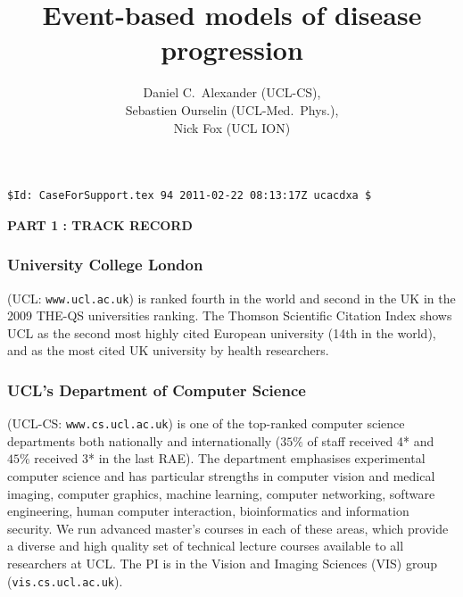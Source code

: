 \documentclass[a4paper,11pt]{article}
\begin{document}


\title{Event-based models of disease progression}

\author{Daniel C.\ Alexander (UCL-CS),\\Sebastien Ourselin (UCL-Med.\ Phys.),\\Nick Fox (UCL ION)}

\date{}

\maketitle

\begin{verbatim}
$Id: CaseForSupport.tex 94 2011-02-22 08:13:17Z ucacdxa $
\end{verbatim}

\clearpage


\setcounter{page}{1}

\textbf{PART 1 : TRACK RECORD}\\

\subsubsection*{University College London}
(UCL: \verb+www.ucl.ac.uk+) is ranked fourth in the world and second
in the UK in the 2009 THE-QS universities ranking. The Thomson
Scientific Citation Index shows UCL as the second most highly cited
European university (14th in the world), and as the most cited UK
university by health researchers.

\subsubsection*{UCL's Department of Computer Science}
(UCL-CS: \verb+www.cs.ucl.ac.uk+) is one of the top-ranked computer
science departments both nationally and internationally ($35\%$ of
staff received 4* and $45\%$ received 3* in the last RAE). The
department emphasises experimental computer science and has particular
strengths in computer vision and medical imaging, computer graphics,
machine learning, computer networking, software engineering, human
computer interaction, bioinformatics and information security. We run
advanced master's courses in each of these areas, which provide a
diverse and high quality set of technical lecture courses available to
all researchers at UCL. The PI is in the Vision and Imaging
Sciences (VIS) group (\verb+vis.cs.ucl.ac.uk+).
\end{document}
